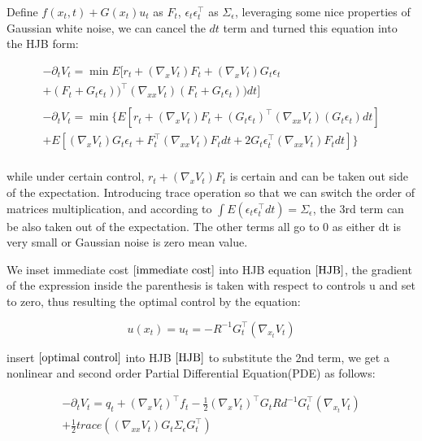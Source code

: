 \documentclass[journal]{IEEEtran}
\begin{document}
Define $f(x_t,t)+G(x_t)u_t$ as $F_t$, $\epsilon_t\epsilon_t^{\top}$ as $\Sigma_{\epsilon}$, leveraging some nice properties of Gaussian white noise, we can cancel the $dt$ term and turned this equation into the 
HJB form:

\begin{equation}
  \begin{aligned}
    -\partial_tV_t  = \min E [r_t + (\nabla_x V_t)F_t +  (\nabla_x V_t)G_t \epsilon_t \\
    + (F_t+G_t \epsilon_t))^{\top}(\nabla_{xx} V_t)(F_t+G_t \epsilon_t)) dt] \nonumber \\
    \quad \\
    -\partial_tV_t = \min \{ E [r_t + (\nabla_x V_t)F_t + (G_t \epsilon_t)^{\top}(\nabla_{xx} V_t)(G_t \epsilon_t)dt] \\
 + E[(\nabla_x V_t)G_t \epsilon_t + F_t^{\top}(\nabla_{xx} V_t)F_tdt + 2G_t \epsilon_t^{\top}(\nabla_{xx} V_t)F_tdt ] \} \\
 \quad 
  \end{aligned}
\end{equation}

while under certain control, $r_t + (\nabla_x V_t)F_t$ is certain and can be taken out side of the expectation. Introducing trace operation so that we can switch the order of matrices multiplication, 
and according to $\int E(\epsilon_t\epsilon_t^{\top} dt ) = \Sigma_{\epsilon}$, the 3rd term can be also taken out of the expectation. The other terms all go to 0 as either dt is very small or 
Gaussian noise is zero mean value.

We inset immediate cost $\ref{immediate cost}$ into HJB equation $\ref{HJB}$, the gradient of the expression inside the parenthesis is taken with respect to controls u and set to zero, thus resulting the optimal control
by the equation:

\begin{equation}
  u(x_t)=u_t =-R^{-1}G_t^{\top}(\nabla_{x_t}V_t)
  \label{optimal control}
\end{equation}

insert $\ref{optimal control}$ into HJB $\ref{HJB}$ to substitute the 2nd term, we get a nonlinear and second order Partial Differential Equation(PDE) as follows:

\begin{equation}
  \begin{aligned}
  -\partial_t V_t = q_t + (\nabla_xV_t)^{\top}f_t -\frac{1}{2}(\nabla_xV_t)^{\top}G_tRd^{-1}G_t^{\top}(\nabla_{x_t}V_t) \\
   + \frac{1}{2}trace((\nabla_{xx}V_t)G_t\Sigma_{\epsilon}G_t^{\top})
  \label{nonlinear PDE}
  \end{aligned}
\end{equation}
\end{document}
